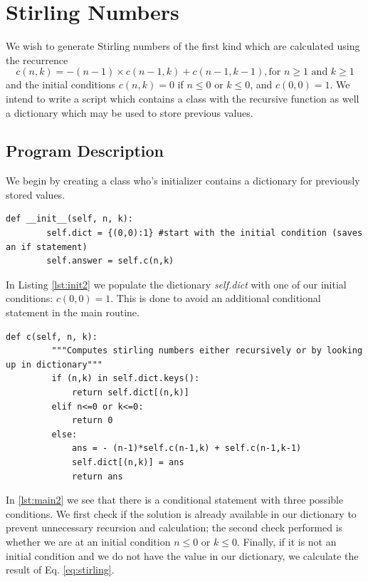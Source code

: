 \section{Stirling Numbers} %
\label{sec:stirling_numbers}
We wish to generate Stirling numbers of the first kind which are calculated using the recurrence
\begin{equation}
    \label{eq:stirling}
    c(n,k) = -(n-1)\times c(n-1,k) + c(n-1,k-1), \mbox{for } n \ge1 \mbox{ and } k \ge 1
\end{equation}
and the initial conditions $c(n,k)=0$ if $n\le0$ or $k\le0$, and $c(0,0)=1$. We intend to write a script which contains a class with the recursive function as well a dictionary which may be used to store previous values.

\subsection{Program Description} %
\label{sub:program_description2}
We begin by creating a class who's initializer contains a dictionary for previously stored values.
\begin{lstlisting}[caption={Initialization}, label=lst:init2,firstnumber=3]
    def __init__(self, n, k):
        self.dict = {(0,0):1} #start with the initial condition (saves an if statement)
        self.answer = self.c(n,k)
\end{lstlisting}\noindent
In Listing \ref{lst:init2} we populate the dictionary \emph{self.dict} with one of our initial conditions: $c(0,0)=1$. This is done to avoid an additional conditional statement in the main routine.
\begin{lstlisting}[caption={Main Logic for Stirling Number Generation}, label=lst:main2,firstnumber=8]
    def c(self, n, k):
         """Computes stirling numbers either recursively or by looking up in dictionary"""
         if (n,k) in self.dict.keys():
             return self.dict[(n,k)]
         elif n<=0 or k<=0:
             return 0
         else:
             ans = - (n-1)*self.c(n-1,k) + self.c(n-1,k-1)
             self.dict[(n,k)] = ans
             return ans
\end{lstlisting}\noindent
In \ref{lst:main2} we see that there is a conditional statement with three possible conditions. We first check if the solution is already available in our dictionary to prevent unnecessary recursion and calculation; the second check performed is whether we are at an initial condition $n\le0$ or $k\le0$. Finally, if it is not an initial condition and we do not have the value in our dictionary, we calculate the result of Eq. \ref{eq:stirling}.

